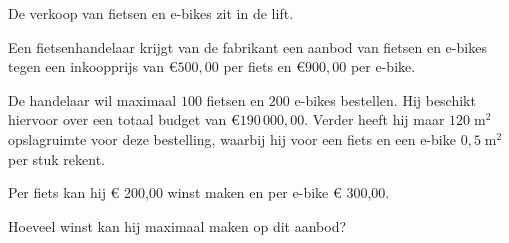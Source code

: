 
    \begin{kader}
    	De verkoop van fietsen en e-bikes zit in de lift.
    	
	    Een fietsenhandelaar krijgt van de fabrikant een aanbod van fietsen en e-bikes tegen een inkoopprijs van $\euro 500,00$ per fiets en $\euro 900,00$ per e-bike. 
	
	    De handelaar wil maximaal $100$ fietsen en $200$ e-bikes bestellen. Hij beschikt hiervoor over een totaal budget van $\euro 190\, 000,00$. Verder heeft hij maar $120\; \mathrm{m}^2$ opslagruimte voor deze bestelling, waarbij hij voor een fiets en een e-bike $0,5\;\mathrm{m}^2$ per stuk rekent.
	
	    Per fiets kan hij € 200,00 winst maken en per e-bike € 300,00.
	
	    Hoeveel winst kan hij maximaal maken op dit aanbod?
    \end{kader}

